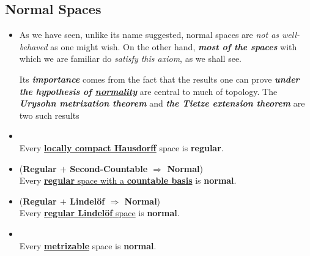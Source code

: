 \documentclass[11pt]{article}
\begin{document}
\subsection{Normal Spaces}
\begin{itemize}
\item \begin{remark}
As we have seen, unlike its name suggested, normal spaces are \emph{not as well-behaved} as one might wish.  On the other hand, \emph{\textbf{most of the spaces}} with which we are familiar do \emph{satisfy this axiom}, as we shall see. 

Its \emph{\textbf{importance}} comes from the fact that the results one can prove \emph{\textbf{under the hypothesis of \underline{normality}}} are central to much of topology. The \emph{\textbf{Urysohn metrization theorem}} and \emph{\textbf{the Tietze extension theorem}} are two such results
\end{remark}

\item \begin{proposition}  \citep{munkres2000topology} \\
Every \underline{\textbf{locally compact Hausdorff}} space is \textbf{regular}.
\end{proposition}



\item \begin{theorem} (\textbf{Regular $+$ Second-Countable $\Rightarrow$ Normal})\citep{munkres2000topology}\\
Every \underline{\textbf{regular} space with a \textbf{countable basis}} is \textbf{normal}.
\end{theorem}

\item \begin{proposition}   (\textbf{Regular $+$ Lindel{\"o}f $\Rightarrow$ Normal})\citep{munkres2000topology}\\
Every \underline{\textbf{regular Lindel{\"o}f} space} is \textbf{normal}.
\end{proposition}



\item \begin{theorem} \citep{munkres2000topology}\\
Every \underline{\textbf{metrizable}} space is \textbf{normal}.
\end{theorem}



\end{itemize}
\end{document}
